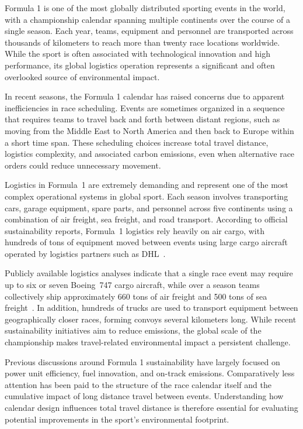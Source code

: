 \documentclass{egpubl}
\begin{document}
Formula 1 is one of the most globally distributed sporting events in the world, with a championship calendar spanning multiple continents over the course of a single season. Each year, teams, equipment and personnel are transported across thousands of kilometers to reach more than twenty race locations worldwide. While the sport is often associated with technological innovation and high performance, its global logistics operation represents a significant and often overlooked source of environmental impact.

In recent seasons, the Formula 1 calendar has raised concerns due to apparent inefficiencies in race scheduling. Events are sometimes organized in a sequence that requires teams to travel back and forth between distant regions, such as moving from the Middle East to North America and then back to Europe within a short time span. These scheduling choices increase total travel distance, logistics complexity, and associated carbon emissions, even when alternative race orders could reduce unnecessary movement.

Logistics in Formula~1 are extremely demanding and represent one of the most complex operational systems in global sport. Each season involves transporting cars, garage equipment, spare parts, and personnel across five continents using a combination of air freight, sea freight, and road transport. According to official sustainability reports, Formula~1 logistics rely heavily on air cargo, with hundreds of tons of equipment moved between events using large cargo aircraft operated by logistics partners such as DHL~\cite{F1Sustainability2025}.

Publicly available logistics analyses indicate that a single race event may require up to six or seven Boeing~747 cargo aircraft, while over a season teams collectively ship approximately 660 tons of air freight and 500 tons of sea freight~\cite{F1LogisticsDHL}. In addition, hundreds of trucks are used to transport equipment between geographically closer races, forming convoys several kilometers long. While recent sustainability initiatives aim to reduce emissions, the global scale of the championship makes travel-related environmental impact a persistent challenge.

Previous discussions around Formula 1 sustainability have largely focused on power unit efficiency, fuel innovation, and on-track emissions. Comparatively less attention has been paid to the structure of the race calendar itself and the cumulative impact of long distance travel between events. Understanding how calendar design influences total travel distance is therefore essential for evaluating potential improvements in the sport’s environmental footprint.
\end{document}
